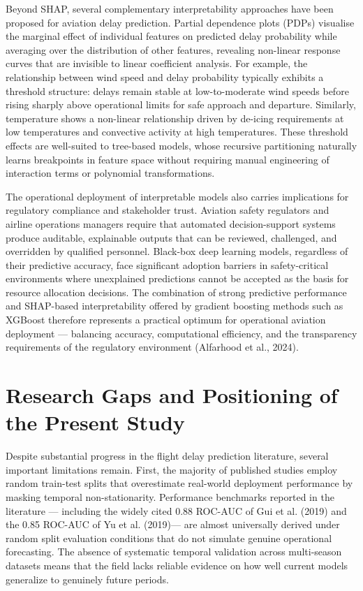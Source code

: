 \documentclass{report}
\begin{document}
Beyond SHAP, several complementary interpretability approaches have been 
proposed for aviation delay prediction. Partial dependence plots (PDPs) 
visualise the marginal effect of individual features on predicted delay 
probability while averaging over the distribution of other features, 
revealing non-linear response curves that are invisible to linear coefficient 
analysis. For example, the relationship between wind speed and delay probability 
typically exhibits a threshold structure: delays remain stable at low-to-moderate 
wind speeds before rising sharply above operational limits for safe approach 
and departure. Similarly, temperature shows a non-linear relationship driven 
by de-icing requirements at low temperatures and convective activity at high 
temperatures. These threshold effects are well-suited to tree-based models, 
whose recursive partitioning naturally learns breakpoints in feature space 
without requiring manual engineering of interaction terms or polynomial 
transformations.

The operational deployment of interpretable models also carries implications 
for regulatory compliance and stakeholder trust. Aviation safety regulators 
and airline operations managers require that automated decision-support systems 
produce auditable, explainable outputs that can be reviewed, challenged, and 
overridden by qualified personnel. Black-box deep learning models, regardless 
of their predictive accuracy, face significant adoption barriers in 
safety-critical environments where unexplained predictions cannot be 
accepted as the basis for resource allocation decisions. The combination of 
strong predictive performance and SHAP-based interpretability offered by 
gradient boosting methods such as XGBoost therefore represents a practical 
optimum for operational aviation deployment --- balancing accuracy, 
computational efficiency, and the transparency requirements of the regulatory 
environment (Alfarhood et al., 2024).


\section{Research Gaps and Positioning of the Present Study}

Despite substantial progress in the flight delay prediction literature, several important limitations remain. First, the majority of published studies employ random train-test splits that overestimate real-world deployment performance by masking temporal non-stationarity. Performance benchmarks reported in the literature --- including the widely cited 0.88 ROC-AUC of Gui et al. (2019) and the 0.85 ROC-AUC of Yu et al. (2019)--- are almost universally derived under random split evaluation conditions that do not simulate genuine operational forecasting. The absence of systematic temporal validation across multi-season datasets means that the field lacks reliable evidence on how well current models generalize to genuinely future periods.
\end{document}
